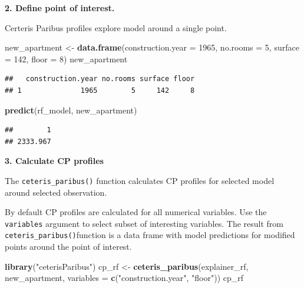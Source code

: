 \documentclass[]{krantz}
\newenvironment{Shaded}{\begin{snugshade}}{\end{snugshade}}
\newcommand{\DataTypeTok}[1]{\textcolor[rgb]{0.13,0.29,0.53}{#1}}
\newcommand{\DecValTok}[1]{\textcolor[rgb]{0.00,0.00,0.81}{#1}}
\newcommand{\KeywordTok}[1]{\textcolor[rgb]{0.13,0.29,0.53}{\textbf{#1}}}
\newcommand{\NormalTok}[1]{#1}
\newcommand{\StringTok}[1]{\textcolor[rgb]{0.31,0.60,0.02}{#1}}
\theoremstyle{definition}
\theoremstyle{definition}
\theoremstyle{definition}
\theoremstyle{remark}
\begin{document}
\textbf{2. Define point of interest.}

Certeris Paribus profiles explore model around a single point.

\begin{Shaded}
\begin{Highlighting}[]
\NormalTok{new_apartment <-}\StringTok{ }\KeywordTok{data.frame}\NormalTok{(}\DataTypeTok{construction.year =} \DecValTok{1965}\NormalTok{, }\DataTypeTok{no.rooms =} \DecValTok{5}\NormalTok{, }\DataTypeTok{surface =} \DecValTok{142}\NormalTok{, }\DataTypeTok{floor =} \DecValTok{8}\NormalTok{)}
\NormalTok{new_apartment}
\end{Highlighting}
\end{Shaded}

\begin{verbatim}
##   construction.year no.rooms surface floor
## 1              1965        5     142     8
\end{verbatim}

\begin{Shaded}
\begin{Highlighting}[]
\KeywordTok{predict}\NormalTok{(rf_model, new_apartment)}
\end{Highlighting}
\end{Shaded}

\begin{verbatim}
##        1 
## 2333.967
\end{verbatim}

\textbf{3. Calculate CP profiles}

The \texttt{ceteris\_paribus()} function calculates CP profiles for
selected model around selected observation.

By default CP profiles are calculated for all numerical variables. Use
the \texttt{variables} argument to select subset of interesting
variables. The result from \texttt{ceteris\_paribus()}function is a data
frame with model predictions for modified points around the point of
interest.

\begin{Shaded}
\begin{Highlighting}[]
\KeywordTok{library}\NormalTok{(}\StringTok{"ceterisParibus"}\NormalTok{)}
\NormalTok{cp_rf <-}\StringTok{ }\KeywordTok{ceteris_paribus}\NormalTok{(explainer_rf, new_apartment, }
                            \DataTypeTok{variables =} \KeywordTok{c}\NormalTok{(}\StringTok{"construction.year"}\NormalTok{, }\StringTok{"floor"}\NormalTok{))}
\NormalTok{cp_rf}
\end{Highlighting}
\end{Shaded}
\end{document}
